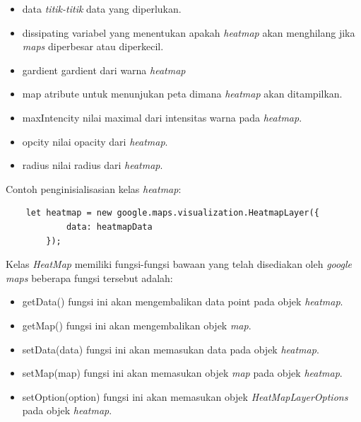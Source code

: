 \begin{itemize}
    \item data \textit{titik-titik} data yang diperlukan.
    \item dissipating variabel yang menentukan apakah \textit{heatmap} akan menghilang jika \textit{maps} diperbesar atau diperkecil.
    \item gardient gardient dari warna \textit{heatmap}
    \item map atribute untuk menunjukan peta dimana \textit{heatmap} akan ditampilkan.
    \item maxIntencity nilai maximal dari intensitas warna pada \textit{heatmap}.
    \item opcity nilai opacity dari \textit{heatmap}.
    \item radius nilai radius dari \textit{heatmap}.
\end{itemize}
Contoh penginisialisasian kelas \textit{heatmap}:
\begin{lstlisting}
    let heatmap = new google.maps.visualization.HeatmapLayer({
            data: heatmapData
        });
\end{lstlisting}
Kelas \textit{HeatMap} memiliki fungsi-fungsi bawaan yang telah disediakan oleh \textit{google maps} beberapa fungsi tersebut adalah:
\begin{itemize}
    \item getData() fungsi ini akan mengembalikan data point pada objek \textit{heatmap}.
    \item getMap() fungsi ini akan mengembalikan objek \textit{map}.
    \item setData(data) fungsi ini akan memasukan data pada objek \textit{heatmap}.
    \item setMap(map) fungsi ini akan memasukan objek \textit{map} pada objek \textit{heatmap}.
    \item setOption(option) fungsi ini akan memasukan  objek \textit{HeatMapLayerOptions} pada objek \textit{heatmap}.
\end{itemize}